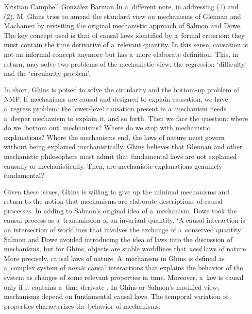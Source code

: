 \begin{recengenv}{Kristian Campbell González Barman}
In a~different note, in addressing (1) and (2), M. Ghins tries to amend the standard view on mechanisms of Glennan and Machamer by revisiting the original mechanistic approach of Salmon and Dowe. The key concept used is that of causal laws identified by a~formal criterion: they must contain the time derivative of a~relevant quantity. In this sense, causation is not an informal concept anymore but has a~more elaborate definition. This, in return, may solve two problems of the mechanistic view: the regression ‘difficulty' and the ‘circularity problem'.

In short, Ghins is poised to solve the circularity and the bottom-up problem of NMP. If mechanisms are causal and designed to explain causation, we have a~regress problem: the lower-level causation present in a~mechanism needs a~deeper mechanism to explain it, and so forth. Then we face the question: where do we ‘bottom out' mechanisms? Where do we stop with mechanistic explanations?
\parencite*[][p.99]{falkenburg_mechanistic_2019} %
 Where the mechanisms end, the laws of nature must govern without being explained mechanistically. Ghins believes that Glennan and other mechanistic philosophers must admit that fundamental laws are not explained causally or mechanistically. Then, are mechanistic explanations genuinely fundamental?

Given these issues, Ghins is willing to give up the minimal mechanisms and return to the notion that mechanisms are elaborate descriptions of causal processes. In adding to Salmon's original idea of a~mechanism, Dowe took the causal process as a~transmission of an invariant quantity. ‘A causal interaction is an intersection of worldlines that involves the exchange of a~conserved quantity'
\parencite*[][p.103]{falkenburg_mechanistic_2019}. %
 Salmon and Dowe avoided introducing the idea of laws into the discussion of mechanisms, but for Ghins, objects are stable worldlines that \textit{need} laws of nature. More precisely, causal laws of nature. A~mechanism in Ghins is defined as a~complex system of \textit{nomic} causal interactions that explains the behavior of the system as changes of some relevant properties in time. Moreover, a~law is causal only if it contains a~time derivate 
\parencite*[][p.106]{falkenburg_mechanistic_2019}. %
 In Ghins or Salmon's modified view, mechanisms depend on fundamental causal laws. The temporal variation of properties characterizes the behavior of mechanisms.


\end{recengenv}
